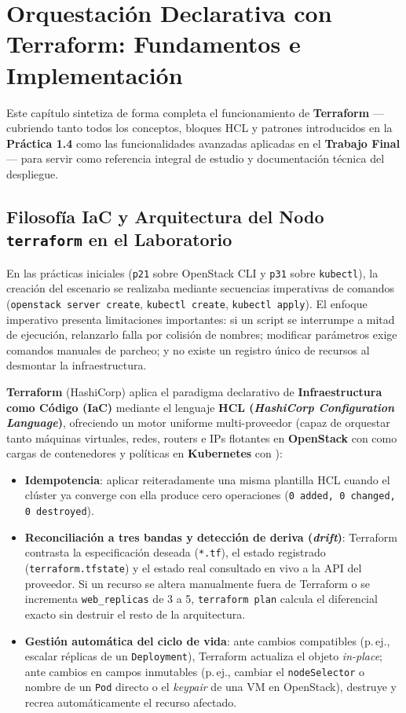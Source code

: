 \chapter{Orquestación Declarativa con Terraform: Fundamentos e Implementación}

Este capítulo sintetiza de forma completa el funcionamiento de \textbf{Terraform} ---cubriendo tanto todos los conceptos, bloques HCL y patrones introducidos en la \textbf{Práctica 1.4} como las funcionalidades avanzadas aplicadas en el \textbf{Trabajo Final}--- para servir como referencia integral de estudio y documentación técnica del despliegue.

\section{Filosofía IaC y Arquitectura del Nodo \texttt{terraform} en el Laboratorio}

En las prácticas iniciales (\texttt{p21} sobre OpenStack CLI y \texttt{p31} sobre \texttt{kubectl}), la creación del escenario se realizaba mediante secuencias imperativas de comandos (\texttt{openstack server create}, \texttt{kubectl create}, \texttt{kubectl apply}). El enfoque imperativo presenta limitaciones importantes: si un script se interrumpe a mitad de ejecución, relanzarlo falla por colisión de nombres; modificar parámetros exige comandos manuales de parcheo; y no existe un registro único de recursos al desmontar la infraestructura.

\textbf{Terraform} (HashiCorp) aplica el paradigma declarativo de \textbf{Infraestructura como Código (IaC)} mediante el lenguaje \textbf{HCL (\textit{HashiCorp Configuration Language})}, ofreciendo un motor uniforme multi-proveedor (capaz de orquestar tanto máquinas virtuales, redes, routers e IPs flotantes en \textbf{OpenStack} con  como cargas de contenedores y políticas en \textbf{Kubernetes} con ):
\begin{itemize}
  \item \textbf{Idempotencia}: aplicar reiteradamente una misma plantilla HCL cuando el clúster ya converge con ella produce cero operaciones (\texttt{0 added, 0 changed, 0 destroyed}).
  \item \textbf{Reconciliación a tres bandas y detección de deriva (\textit{drift})}: Terraform contrasta la especificación deseada (\texttt{*.tf}), el estado registrado (\texttt{terraform.tfstate}) y el estado real consultado en vivo a la API del proveedor. Si un recurso se altera manualmente fuera de Terraform o se incrementa \texttt{web\_replicas} de 3 a 5, \texttt{terraform plan} calcula el diferencial exacto sin destruir el resto de la arquitectura.
  \item \textbf{Gestión automática del ciclo de vida}: ante cambios compatibles (p.\,ej., escalar réplicas de un \texttt{Deployment}), Terraform actualiza el objeto \textit{in-place}; ante cambios en campos inmutables (p.\,ej., cambiar el \texttt{nodeSelector} o nombre de un \texttt{Pod} directo o el \textit{keypair} de una VM en OpenStack), destruye y recrea automáticamente el recurso afectado.
\end{itemize}

